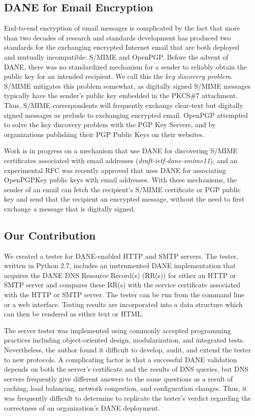 \documentclass[preprint,3p,11pt]{elsarticle}
\begin{document}
\subsection{DANE for Email Encryption}

End-to-end encryption of email messages is complicated by the fact
that more than two decades of research and standards development
has produced two 
standards for the exchanging encrypted Internet email that are both
deployed and mutually incompatible:
S/MIME\cite{rfc5750} and OpenPGP\cite{rfc4880}. Before the advent of
DANE, there was no standardized mechanism for a sender to reliably obtain the
public key for an intended recipient. We call this the \emph{key
  discovery problem}. S/MIME mitigates this problem somewhat,
as digitally signed S/MIME messages typically have the sender's public
key embedded in the PKCS\#7 attachment\cite{rfc2315}. Thus, S/MIME
correspondents will frequently exchange clear-text but digitally
signed messages as prelude to exchanging encrypted email. OpenPGP
attempted to solve the key discovery problem with the PGP Key
Servers, and by organizations publishing their PGP Public Keys on
their websites. 

Work is in progress on a mechanism that use DANE for discovering S/MIME certificates
associated with email addresses (\emph{draft-ietf-dane-smime11}), and
an experimental RFC was recently approved that uses DANE for associating OpenPGPKey
public keys with email addresses\cite{rfc7929}. With these mechanisms,
the sender of an email can fetch the recipient's S/MIME certificate or
PGP public key and send that the recipient an encrypted message,
without the need to first exchange a message that is digitally signed.

\subsection{Our Contribution}

We created a tester for DANE-enabled HTTP and SMTP servers. The
tester, written in Python 2.7, includes an instrumented DANE
implementation that acquires the DANE DNS Resource Record(s) (RR(s)) for
either an HTTP or SMTP server and compares these RR(s) with the service
certificate associated with the HTTP or SMTP server. The tester can be run from
the command line or a web interface. Testing results are incorporated into
a data structure which can then be rendered as either text or HTML.

The server tester was implemented using commonly accepted
programming practices including object-oriented design,
modularization, and integrated tests. Nevertheless, the author found
it difficult to develop, audit, and extend the tester to new protocols. A 
complicating factor is that a successful DANE validation depends on both the server's certificate and the results of DNS
queries, but DNS servers frequently give different answers to the same
questions as a result of caching, load balancing, network congestion,
and configuration changes. Thus, it was frequently difficult to
determine to replicate the tester's verdict regarding the correctness
of an organization's DANE deployment.
\end{document}
